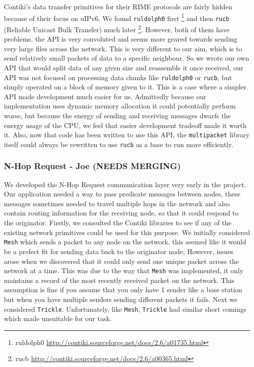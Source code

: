 Contiki's data transfer primitives for their RIME protocols are fairly hidden because of their focus on uIPv6. We found \verb|ruldolph0| first \footnote{ruldolph0 \url{http://contiki.sourceforge.net/docs/2.6/a01735.html}} and then \verb|rucb| (Reliable Unicast Bulk Transfer) much later \footnote{rucb \url{http://contiki.sourceforge.net/docs/2.6/a00365.html}}. However, both of them have problems, the API is very convoluted and seems more geared towards sending very large files across the network. This is very different to our aim, which is to send relatively small packets of data to a specific neighbour. So we wrote our own API that would split data of any given size and reassemble it once received, our API was not focused on processing data chunks like \verb|ruldolph0| or \verb|rucb|, but simply operated on a block of memory given to it. This is a case where a simpler API made development much easier for us. Admittedly because our implementation uses dynamic memory allocation it could potentially perform worse, but because the energy of sending and receiving messages dwarfs the energy usage of the CPU, we feel that easier development tradeoff made it worth it. Also, now that code has been written to use this API, the \verb|multipacket| library itself could always be rewritten to use \verb|rucb| as a base to run more efficiently.

\subsubsection{N-Hop Request - Joe (NEEDS MERGING)} 

We developed the N-Hop Request communication layer very early in the project. Our application needed a way to pass predicate messages between nodes, these messages sometimes needed to travel multiple hops in the network and also contain routing information for the receiving node, so that it could respond to the originator. Firstly, we consulted the Contiki libraries to see if any of the existing network primitives could be used for this purpose. We initially considered \verb|Mesh| which sends a packet to any node on the network, this seemed like it would be a prefect fit for sending data back to the originator node; However, issues arose when we discovered that it could only send one unique packet across the network at a time. This was due to the way that \verb|Mesh| was implemented, it only maintains a record of the most recently received packet on the network. This assumption is fine if you assume that you only have 1 sender like a base station but when you have multiple senders sending different packets it fails. Next we considered \verb|Trickle|. Unfortunately, like \verb|Mesh|, \verb|Trickle| had similar short comings which made unsuitable for our task.

